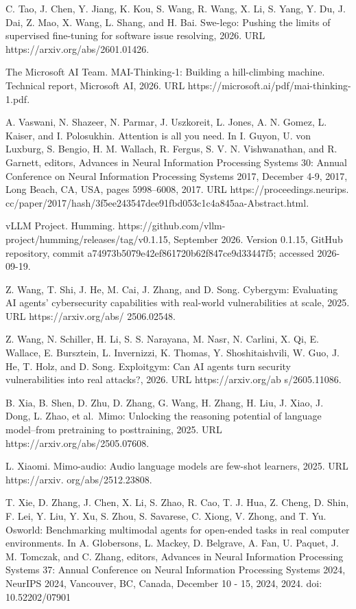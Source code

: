 C. Tao, J. Chen, Y. Jiang, K. Kou, S. Wang, R. Wang, X. Li, S. Yang, Y.
Du, J. Dai, Z. Mao, X. Wang, L. Shang, and H. Bai. Swe-lego: Pushing the
limits of supervised fine-tuning for software issue resolving, 2026. URL
https://arxiv.org/abs/2601.01426.

The Microsoft AI Team. MAI-Thinking-1: Building a hill-climbing machine.
Technical report, Microsoft AI, 2026. URL
https://microsoft.ai/pdf/mai-thinking-1.pdf.

A. Vaswani, N. Shazeer, N. Parmar, J. Uszkoreit, L. Jones, A. N. Gomez,
L. Kaiser, and I. Polosukhin. Attention is all you need. In I. Guyon, U.
von Luxburg, S. Bengio, H. M. Wallach, R. Fergus, S. V. N. Vishwanathan,
and R. Garnett, editors, Advances in Neural Information Processing
Systems 30: Annual Conference on Neural Information Processing Systems
2017, December 4-9, 2017, Long Beach, CA, USA, pages 5998--6008, 2017.
URL https://proceedings.neurips.
cc/paper/2017/hash/3f5ee243547dee91fbd053c1c4a845aa-Abstract.html.

vLLM Project. Humming. https://github.com/vllm-project/humming/releases/tag/v0.1.15,
September 2026. Version 0.1.15, GitHub repository, commit
a74973b5079e42ef861720b62f847ce9d33447f5; accessed 2026-09-19.

Z. Wang, T. Shi, J. He, M. Cai, J. Zhang, and D. Song. Cybergym:
Evaluating AI agents' cybersecurity capabilities with real-world
vulnerabilities at scale, 2025. URL https://arxiv.org/abs/ 2506.02548.

Z. Wang, N. Schiller, H. Li, S. S. Narayana, M. Nasr, N. Carlini, X. Qi,
E. Wallace, E. Bursztein, L. Invernizzi, K. Thomas, Y. Shoshitaishvili,
W. Guo, J. He, T. Holz, and D. Song. Exploitgym: Can AI agents turn
security vulnerabilities into real attacks?, 2026. URL
https://arxiv.org/ab s/2605.11086.

B. Xia, B. Shen, D. Zhu, D. Zhang, G. Wang, H. Zhang, H. Liu, J. Xiao,
J. Dong, L. Zhao, et al.~Mimo: Unlocking the reasoning potential of
language model--from pretraining to posttraining, 2025. URL
https://arxiv.org/abs/2505.07608.

L. Xiaomi. Mimo-audio: Audio language models are few-shot learners,
2025. URL https://arxiv. org/abs/2512.23808.

T. Xie, D. Zhang, J. Chen, X. Li, S. Zhao, R. Cao, T. J. Hua, Z. Cheng,
D. Shin, F. Lei, Y. Liu, Y. Xu, S. Zhou, S. Savarese, C. Xiong, V.
Zhong, and T. Yu. Osworld: Benchmarking multimodal agents for open-ended
tasks in real computer environments. In A. Globersons, L. Mackey, D.
Belgrave, A. Fan, U. Paquet, J. M. Tomczak, and C. Zhang, editors,
Advances in Neural Information Processing Systems 37: Annual Conference
on Neural Information Processing Systems 2024, NeurIPS 2024, Vancouver,
BC, Canada, December 10 - 15, 2024, 2024. doi: 10.52202/07901



